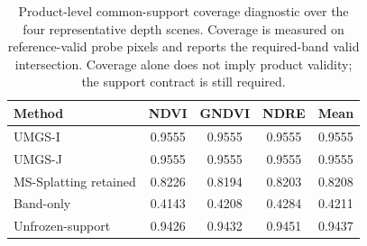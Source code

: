 \begin{table}[H]
    \caption{Product-level common-support coverage diagnostic over the four representative depth scenes. Coverage is measured on reference-valid probe pixels and reports the required-band valid intersection. Coverage alone does not imply product validity; the support contract is still required.}
    \label{tab:supp-product-coverage}
    \centering
    \scriptsize
    \setlength{\tabcolsep}{3pt}
    \begin{tabular}{lcccc}
        \toprule
        Method & NDVI & GNDVI & NDRE & Mean \\
        \midrule
        UMGS-I & 0.9555 & 0.9555 & 0.9555 & 0.9555 \\
        UMGS-J & 0.9555 & 0.9555 & 0.9555 & 0.9555 \\
        MS-Splatting retained & 0.8226 & 0.8194 & 0.8203 & 0.8208 \\
        Band-only & 0.4143 & 0.4208 & 0.4284 & 0.4211 \\
        Unfrozen-support & 0.9426 & 0.9432 & 0.9451 & 0.9437 \\
        \bottomrule
    \end{tabular}
\end{table}
